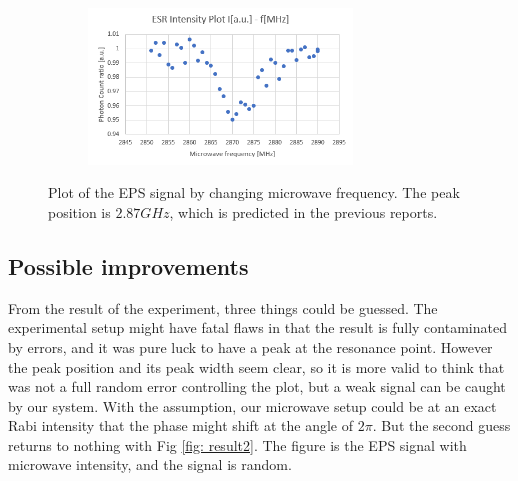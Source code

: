 \documentclass{article}
\begin{document}
\begin{figure}[ht]
    \centering
    \begin{subfigure}[b]{7cm}
        \centering
        \includegraphics[width=7cm]{./figs/result.png}
    \end{subfigure}
    \hfill
    \caption{
        Plot of the EPS signal by changing microwave frequency.
        The peak position is $2.87 GHz$, which is predicted in the previous reports.
    }
    \label{fig: result}
\end{figure}


\subsection{Possible improvements}
\label{section: improvements}
From the result of the experiment, three things could be guessed.
The experimental setup might have fatal flaws in that the result is fully contaminated by errors, and it was pure luck to have a peak at the resonance point.
However the peak position and its peak width seem clear, so it is more valid to think that was not a full random error controlling the plot, but a weak signal can be caught by our system.
With the assumption, our microwave setup could be at an exact Rabi intensity that the phase might shift at the angle of $2 \pi$.
But the second guess returns to nothing with Fig \ref{fig: result2}.
The figure is the EPS signal with microwave intensity, and the signal is random.
\end{document}
